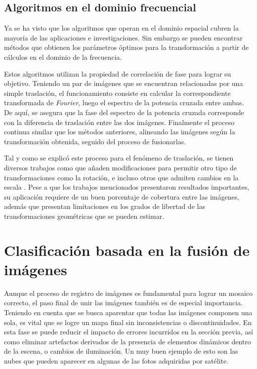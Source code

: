 \subsection*{Algoritmos en el dominio frecuencial}

Ya se ha visto que los algoritmos que operan en el dominio espacial cubren la mayoría de las aplicaciones e investigaciones. Sin embargo se pueden encontrar métodos que obtienen los parámetros óptimos para la transformación a partir de cálculos en el dominio de la frecuencia. 

Estos algoritmos utilizan la propiedad de correlación de fase para lograr su objetivo. Teniendo un par de imágenes que se encuentran relacionadas por una simple traslación, el funcionamiento consiste en calcular la correspondiente transformada de \textit{Fourier}, luego el espectro de la potencia cruzada entre ambas. De aquí, se asegura que la fase del espectro de la potencia cruzada corresponde con la diferencia de traslación entre las dos imágenes. Finalmente el proceso continua similar que los métodos anteriores, alineando las imágenes según la transformación obtenida, seguido del proceso de fusionarlas.

Tal y como se explicó este proceso para el fenómeno de traslación, se tienen diversos trabajos como \cite{phase-rot} que añaden modificaciones para permitir otro tipo de transformaciones como la rotación, e incluso otros que admiten cambios en la escala \cite{phase-scale}. Pese a que los trabajos mencionados presentaron resultados importantes, su aplicación requiere de un buen porcentaje de cobertura entre las imágenes, además que presentan limitaciones en los grados de libertad de las transformaciones geométricas que se pueden estimar.


\section*{Clasificación basada en la fusión de imágenes}

Aunque el proceso de registro de imágenes es fundamental para lograr un mosaico correcto, el paso final de unir las imágenes también es de especial importancia. Teniendo en cuenta que se busca aparentar que todas las imágenes componen una sola, es vital que se logre un mapa final sin inconsistencias o discontinuidades. En esta fase se puede reducir el impacto de errores incurridos en la sección previa, así como eliminar artefactos derivados de la presencia de elementos dinámicos dentro de la escena, o cambios de iluminación. Un muy buen ejemplo de esto son las nubes que pueden aparecer en algunas de las fotos adquiridas por satélite.

